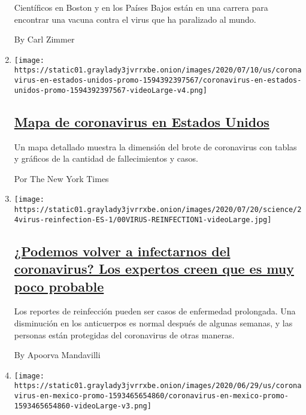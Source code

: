 \begin{enumerate}
  Científicos en Boston y en los Países Bajos están en una carrera para
  encontrar una vacuna contra el virus que ha paralizado al mundo.

  By Carl Zimmer
\item
  \texttt{[image: https://static01.graylady3jvrrxbe.onion/images/2020/07/10/us/coronavirus-en-estados-unidos-promo-1594392397567/coronavirus-en-estados-unidos-promo-1594392397567-videoLarge-v4.png]}

  \hypertarget{mapa-de-coronavirus-en-estados-unidos}{%
  \subsection{\texorpdfstring{\href{/es/interactive/2020/espanol/mundo/coronavirus-en-estados-unidos.html}{Mapa
  de coronavirus en Estados
  Unidos}}{Mapa de coronavirus en Estados Unidos}}\label{mapa-de-coronavirus-en-estados-unidos}}

  Un mapa detallado muestra la dimensión del brote de coronavirus con
  tablas y gráficos de la cantidad de fallecimientos y casos.

  Por The New York Times
\item
  \texttt{[image: https://static01.graylady3jvrrxbe.onion/images/2020/07/20/science/24virus-reinfection-ES-1/00VIRUS-REINFECTION1-videoLarge.jpg]}

  \hypertarget{podemos-volver-a-infectarnos-del-coronavirus-los-expertos-creen-que-es-muy-poco-probable}{%
  \subsection{\texorpdfstring{\href{/es/2020/07/24/espanol/ciencia-y-tecnologia/reinfeccion-coronavirus.html}{¿Podemos
  volver a infectarnos del coronavirus? Los expertos creen que es muy
  poco
  probable}}{¿Podemos volver a infectarnos del coronavirus? Los expertos creen que es muy poco probable}}\label{podemos-volver-a-infectarnos-del-coronavirus-los-expertos-creen-que-es-muy-poco-probable}}

  Los reportes de reinfección pueden ser casos de enfermedad prolongada.
  Una disminución en los anticuerpos es normal después de algunas
  semanas, y las personas están protegidas del coronavirus de otras
  maneras.

  By Apoorva Mandavilli
\item
  \texttt{[image: https://static01.graylady3jvrrxbe.onion/images/2020/06/29/us/coronavirus-en-mexico-promo-1593465654860/coronavirus-en-mexico-promo-1593465654860-videoLarge-v3.png]}


\end{enumerate}
